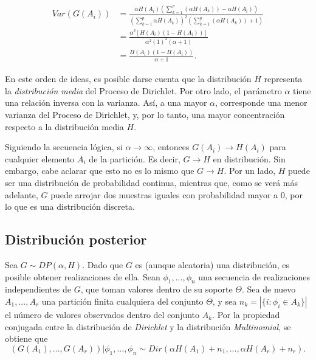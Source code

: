 \begin{equation*}
\begin{aligned}
    Var(G(A_i)) 
    &= \frac{\alpha H(A_i)\left(\sum_{k=1}^p(\alpha H(A_k)) - \alpha H(A_i)\right)}
       {\left(\sum_{k=1}^p \alpha H(A_k)\right)^2\left(\sum_{k=1}^p(\alpha H(A_k)) + 1\right)} \\
    &= \frac{\alpha^2 [H(A_i)(1 - H(A_i))]}
       {\alpha^2 (1)^2(\alpha + 1)} \\
    &= \frac{H(A_i)(1 - H(A_i))}
       {\alpha + 1}.
\end{aligned}
\end{equation*}

En este orden de ideas, es posible darse cuenta que la distribuci\'on $H$ representa la \textit{distribuci\'on media} del Proceso de Dirichlet. Por otro lado, el par\'ametro $\alpha$ tiene una relaci\'on inversa con la varianza. As\'i, a una mayor $\alpha$, corresponde una menor varianza del Proceso de Dirichlet, y, por lo tanto, una mayor concentraci\'on respecto a la distribuci\'on media $H$. 

Siguiendo la secuencia l\'ogica, si $\alpha \rightarrow \infty$, entonces $G(A_i) \rightarrow H(A_i)$ para cualquier elemento $A_i$ de la partici\'on. Es decir, $G \rightarrow H$ en distribuci\'on. Sin embargo, cabe aclarar que esto no es lo mismo que $G \rightarrow H$. Por un lado, $H$ puede ser una distribuci\'on de probabilidad continua, mientras que, como se ver\'a m\'as adelante, $G$ puede arrojar dos muestras iguales con probabilidad mayor a 0, por lo que es una distribuci\'on discreta.

\subsection{Distribuci\'on posterior}

Sea $G \sim DP(\alpha,H)$. Dado que $G$ es (aunque aleatoria) una distribuci\'on, es posible obtener realizaciones de ella. Sean $\phi_1,..., \phi_n$ una secuencia de realizaciones independientes de $G$, que toman valores dentro de su soporte $\Theta$. Sea de nuevo $A_1,...,A_r$ una partici\'on finita cualquiera del conjunto $\Theta$, y sea $n_k = |\{i: \phi_i \in A_k\}|$ el n\'umero de valores observados dentro del conjunto $A_k$. Por la propiedad conjugada entre la distribuci\'on de \textit{Dirichlet} y la distribuci\'on \textit{Multinomial}, se obtiene que
\begin{equation*}
   (G(A_1),...,G(A_r))|\phi_1,...,\phi_n \sim Dir(\alpha H(A_1) + n_1,...,\alpha H(A_r) + n_r). 
\end{equation*}

